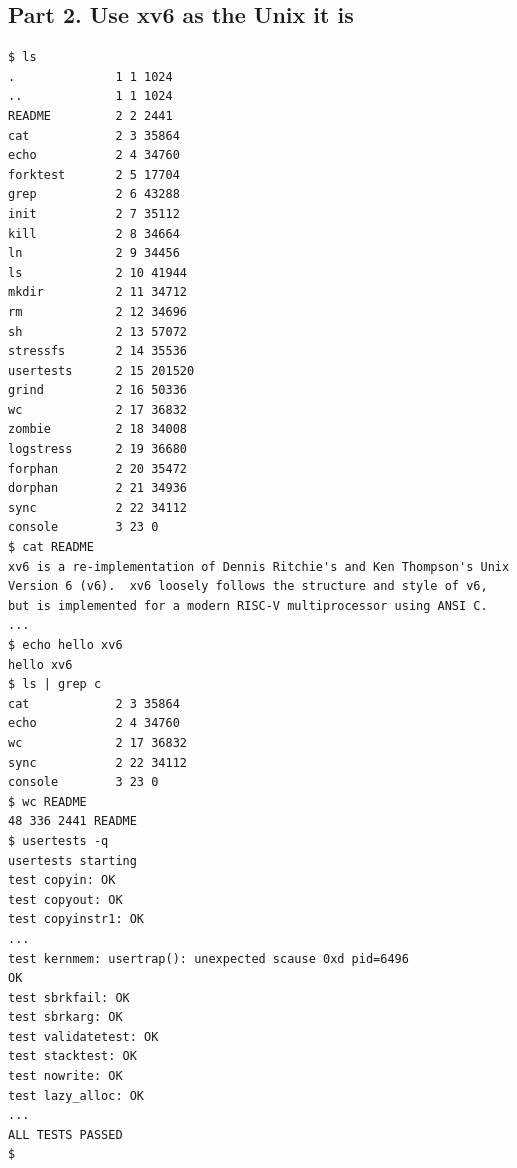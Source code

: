 \documentclass{labreport}
\begin{document}
\subsection{Part 2. Use xv6 as the Unix it is}
\begin{lstlisting}[style=bash]
$ ls
.              1 1 1024
..             1 1 1024
README         2 2 2441
cat            2 3 35864
echo           2 4 34760
forktest       2 5 17704
grep           2 6 43288
init           2 7 35112
kill           2 8 34664
ln             2 9 34456
ls             2 10 41944
mkdir          2 11 34712
rm             2 12 34696
sh             2 13 57072
stressfs       2 14 35536
usertests      2 15 201520
grind          2 16 50336
wc             2 17 36832
zombie         2 18 34008
logstress      2 19 36680
forphan        2 20 35472
dorphan        2 21 34936
sync           2 22 34112
console        3 23 0
$ cat README
xv6 is a re-implementation of Dennis Ritchie's and Ken Thompson's Unix
Version 6 (v6).  xv6 loosely follows the structure and style of v6,
but is implemented for a modern RISC-V multiprocessor using ANSI C.
...
$ echo hello xv6
hello xv6
$ ls | grep c
cat            2 3 35864
echo           2 4 34760
wc             2 17 36832
sync           2 22 34112
console        3 23 0
$ wc README
48 336 2441 README
$ usertests -q
usertests starting
test copyin: OK
test copyout: OK
test copyinstr1: OK
...
test kernmem: usertrap(): unexpected scause 0xd pid=6496
OK
test sbrkfail: OK
test sbrkarg: OK
test validatetest: OK
test stacktest: OK
test nowrite: OK
test lazy_alloc: OK
...
ALL TESTS PASSED
$
\end{lstlisting}
\end{document}
